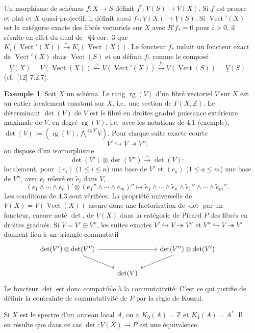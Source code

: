 \documentclass[12pt,a4paper]{article}
\theoremstyle{plain}
\theoremstyle{definition}
\newtheorem{example}[theorem]{Exemple}
\DeclareMathOperator{\rank}{rg}
\DeclareMathOperator{\Vect}{Vect}
\newcommand{\ZZ}{\mathbb{Z}}
\begin{document}
Un morphisme de sch\'emas $f: X \to S$ d\'efinit $f^*: \underline{V}(S) \to \underline{V}(X)$. Si $f$ est
propre et plat et $X$ quasi-projectif, il d\'efinit aussi $f_*: \underline{V}(X) \to \underline{V}(S)$. Si
$\Vect'(X)$ est la cat\'egorie exacte des fibr\'es vectoriels sur $X$ avec $R^i f_* = 0$
pour $i > 0$, il r\'esulte en effet du dual de~\cite{12} \S4 cor.~3 que $K_i(\Vect'(X)) \xrightarrow{\sim}
K_i(\Vect(X))$. Le foncteur $f_*$ induit un foncteur exact de $\Vect'(X)$ dans $\Vect(S)$
et on d\'efinit $f_*$ comme le compos\'e
\[
\underline{V}(X) = V(\Vect(X)) \xleftarrow{\sim} V(\Vect'(X)) \xrightarrow{f_*} V(\Vect(S)) = \underline{V}(S)
\]
(cf.~[12] 7.2.7).

\begin{example}
Soit $X$ un sch\'ema. Le rang $\rank(V)$ d'un fibr\'e vectoriel $V$ sur
$X$ est un entier localement constant sur $X$, i.e.\ une section de $\Gamma(X, \ZZ)$. Le
d\'eterminant $\det(V)$ de $V$ est le fibr\'e en droites gradu\'e puissance ext\'erieure
maximale de $V$, en degr\'e $\rank(V)$, i.e.\ avec les notations de 4.1 (exemple), $\det(V)
:= (\rank(V), \bigwedge^{\rank V} V)$. Pour chaque suite exacte courte
\[
V' \hookrightarrow V \twoheadrightarrow V'' .
\]
on dispose d'un isomorphisme
\[
\det(V') \otimes \det(V'') \xrightarrow{\sim} \det(V):
\]
localement, pour $(e_i)$ ($1 \leq i \leq n$) une base de $V'$ et $(e_a)$ ($1 \leq a \leq m$) une
base de $V''$, avec $e_i$ relev\'e en $\tilde{e}_i$ dans $V$,
\[
(e_1 \wedge \cdots \wedge e_n)' \otimes (e_1'' \wedge \cdots \wedge e_m)'' \mapsto \tilde{e}_1 \wedge \cdots \wedge \tilde{e}_n \wedge \tilde{e}_1'' \wedge \cdots \wedge \tilde{e}_m'' .
\]
Les conditions de 4.3 sont v\'erifi\'ees. La propri\'et\'e universelle de $\underline{V}(X) = V(\Vect(X))$
assure donc une factorisation de $\det$ par un foncteur, encore not\'e $\det$, de
$\underline{V}(X)$ dans la cat\'egorie de Picard $P$ des fibr\'es en droites gradu\'es. Si $V =
V' \oplus V''$, les suites exactes $V' \hookrightarrow V \twoheadrightarrow V''$ et $V'' \hookrightarrow V \twoheadrightarrow V'$ donnent lieu \`a
un triangle commutatif
\[
\begin{tikzcd}
\det(V') \otimes \det(V'') \arrow[rr] \arrow[dr] & & \det(V'') \otimes \det(V') \arrow[dl] \\
& \det(V) &
\end{tikzcd}
\]
Le foncteur $\det$ est donc compatible \`a la commutativit\'e: C'est ce qui justifie
de d\'efinir la contrainte de commutativit\'e de $P$ par la r\`egle de Koszul.

Si $X$ est le spectre d'un anneau local $A$, on a $K_0(A) = \ZZ$ et $K_1(A) =
A^*$. Il en r\'esulte que dans ce cas $\det: \underline{V}(X) \to P$ est une \'equivalence.


\end{example}
\end{document}
